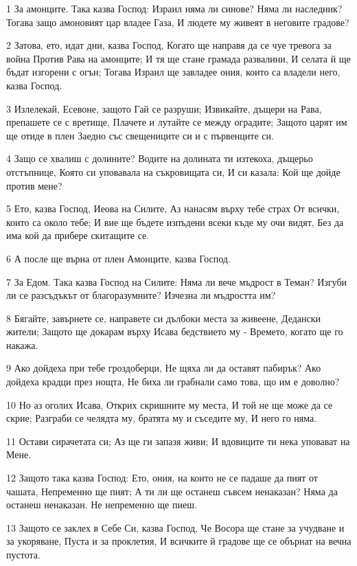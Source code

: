 \par 1 За амонците. Така казва Господ: Израил няма ли синове? Няма ли наследник? Тогава защо амоновият цар владее Газа, И людете му живеят в неговите градове?
\par 2 Затова, ето, идат дни, казва Господ, Когато ще направя да се чуе тревога за война Против Рава на амонците; И тя ще стане грамада развалини, И селата й ще бъдат изгорени с огън; Тогава Израил ще завладее ония, които са владели него, казва Господ.
\par 3 Излелекай, Есевоне, защото Гай се разруши; Извикайте, дъщери на Рава, препашете се с вретище, Плачете и лутайте се между оградите; Защото царят им ще отиде в плен Заедно със свещениците си и с първенците си.
\par 4 Защо се хвалиш с долините? Водите на долината ти изтекоха, дъщерьо отстъпнице, Която си уповавала на съкровищата си, И си казала: Кой ще дойде против мене?
\par 5 Ето, казва Господ, Иеова на Силите, Аз нанасям върху тебе страх От всички, които са около тебе; И вие ще бъдете изпъдени всеки къде му очи видят, Без да има кой да прибере скитащите се.
\par 6 А после ще върна от плен Амонците, казва Господ.
\par 7 За Едом. Така казва Господ на Силите: Няма ли вече мъдрост в Теман? Изгуби ли се разсъдъкът от благоразумните? Изчезна ли мъдростта им?
\par 8 Бягайте, завърнете се, направете си дълбоки места за живеене, Дедански жители; Защото ще докарам върху Исава бедствието му - Времето, когато ще го накажа.
\par 9 Ако дойдеха при тебе гроздоберци, Не щяха ли да оставят пабирък? Ако дойдеха крадци през нощта, Не биха ли грабнали само това, що им е доволно?
\par 10 Но аз оголих Исава, Открих скришните му места, И той не ще може да се скрие; Разграби се челядта му, братята му и съседите му, И него го няма.
\par 11 Остави сирачетата си; Аз ще ги запазя живи; И вдовиците ти нека уповават на Мене.
\par 12 Защото така казва Господ: Ето, ония, на които не се падаше да пият от чашата, Непременно ще пият; А ти ли ще останеш съвсем ненаказан? Няма да останеш ненаказан. Не непременно ще пиеш.
\par 13 Защото се заклех в Себе Си, казва Господ, Че Восора ще стане за учудване и за укоряване, Пуста и за проклетия, И всичките й градове ще се обърнат на вечна пустота.
